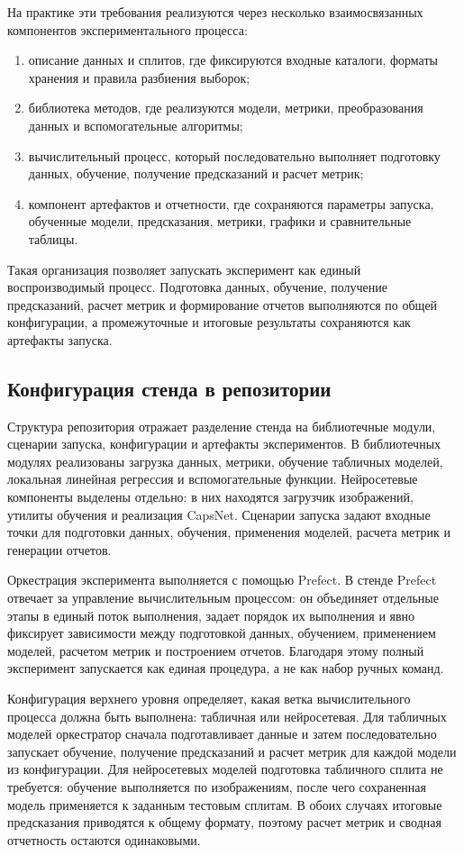 \documentclass[12pt,a4paper]{article}
\begin{document}
На практике эти требования реализуются через несколько взаимосвязанных компонентов экспериментального процесса:
\begin{enumerate}[label=\arabic*.]
    \item описание данных и сплитов, где фиксируются входные каталоги, форматы хранения и правила разбиения выборок;
    \item библиотека методов, где реализуются модели, метрики, преобразования данных и вспомогательные алгоритмы;
    \item вычислительный процесс, который последовательно выполняет подготовку данных, обучение, получение предсказаний и расчет метрик;
    \item компонент артефактов и отчетности, где сохраняются параметры запуска, обученные модели, предсказания, метрики, графики и сравнительные таблицы.
\end{enumerate}

Такая организация позволяет запускать эксперимент как единый воспроизводимый процесс. Подготовка данных, обучение, получение предсказаний, расчет метрик и формирование отчетов выполняются по общей конфигурации, а промежуточные и итоговые результаты сохраняются как артефакты запуска.

\subsection{Конфигурация стенда в репозитории}

Структура репозитория отражает разделение стенда на библиотечные модули, сценарии запуска, конфигурации и артефакты экспериментов. В библиотечных модулях реализованы загрузка данных, метрики, обучение табличных моделей, локальная линейная регрессия и вспомогательные функции. Нейросетевые компоненты выделены отдельно: в них находятся загрузчик изображений, утилиты обучения и реализация CapsNet. Сценарии запуска задают входные точки для подготовки данных, обучения, применения моделей, расчета метрик и генерации отчетов.

Оркестрация эксперимента выполняется с помощью Prefect. В стенде Prefect отвечает за управление вычислительным процессом: он объединяет отдельные этапы в единый поток выполнения, задает порядок их выполнения и явно фиксирует зависимости между подготовкой данных, обучением, применением моделей, расчетом метрик и построением отчетов. Благодаря этому полный эксперимент запускается как единая процедура, а не как набор ручных команд.

Конфигурация верхнего уровня определяет, какая ветка вычислительного процесса должна быть выполнена: табличная или нейросетевая. Для табличных моделей оркестратор сначала подготавливает данные и затем последовательно запускает обучение, получение предсказаний и расчет метрик для каждой модели из конфигурации. Для нейросетевых моделей подготовка табличного сплита не требуется: обучение выполняется по изображениям, после чего сохраненная модель применяется к заданным тестовым сплитам. В обоих случаях итоговые предсказания приводятся к общему формату, поэтому расчет метрик и сводная отчетность остаются одинаковыми.
\end{document}
